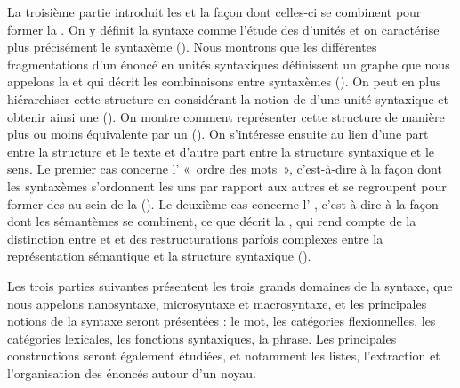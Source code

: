 La troisième partie introduit les  et la façon dont celles-ci se combinent pour former la . On y définit la syntaxe comme l’étude des  d’unités et on caractérise plus précisément le syntaxème (). Nous montrons que les différentes fragmentations d’un énoncé en unités syntaxiques définissent un graphe que nous appelons la  et qui décrit les combinaisons entre syntaxèmes (). On peut en plus hiérarchiser cette structure en considérant la notion de  d’une unité syntaxique et obtenir ainsi une  (). On montre comment représenter cette structure de manière plus ou moins équivalente par un  (). On s’intéresse ensuite au lien d’une part entre la structure et le texte et d’autre part entre la structure syntaxique et le sens. Le premier cas concerne l’ «~ordre des mots~», c’est-à-dire à la façon dont les syntaxèmes s’ordonnent les uns par rapport aux autres et se regroupent pour former des  au sein de la  (). Le deuxième cas concerne l’ , c’est-à-dire à la façon dont les sémantèmes se combinent, ce que décrit la , qui rend compte de la distinction entre  et  et des restructurations parfois complexes entre la représentation sémantique et la structure syntaxique ().

Les trois parties suivantes présentent les trois grands domaines de la syntaxe, que nous appelons nanosyntaxe, microsyntaxe et macrosyntaxe, et les principales notions de la syntaxe seront présentées : le mot, les catégories flexionnelles, les catégories lexicales, les fonctions syntaxiques, la phrase. Les principales constructions seront également étudiées, et notamment les listes, l’extraction et l’organisation des énoncés autour d’un noyau.

